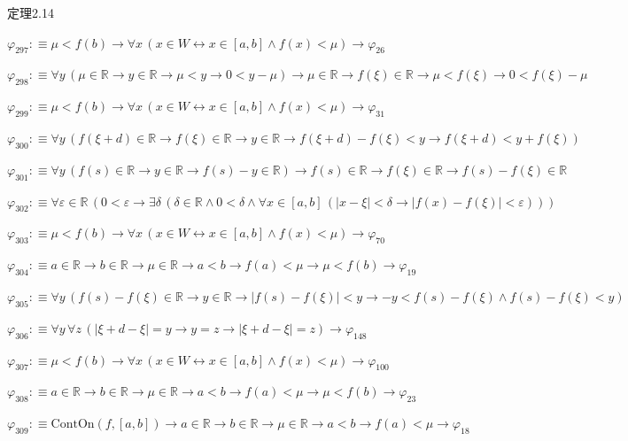 \begin{fullproof}{定理2.14}
\begin{abbrevlist}
\item $\varphi_{297} :\equiv \mu < f(b) \to \forall x\,(x \in W \leftrightarrow x \in [a,b] \land f(x) < \mu) \to \varphi_{26}$
\item $\varphi_{298} :\equiv \forall y\,(\mu \in \mathbb{R} \to y \in \mathbb{R} \to \mu < y \to 0 < y - \mu) \to \mu \in \mathbb{R} \to f(\xi) \in \mathbb{R} \to \mu < f(\xi) \to 0 < f(\xi) - \mu$
\item $\varphi_{299} :\equiv \mu < f(b) \to \forall x\,(x \in W \leftrightarrow x \in [a,b] \land f(x) < \mu) \to \varphi_{31}$
\item $\varphi_{300} :\equiv \forall y\,(f(\xi + d) \in \mathbb{R} \to f(\xi) \in \mathbb{R} \to y \in \mathbb{R} \to f(\xi + d) - f(\xi) < y \to f(\xi + d) < y + f(\xi))$
\item $\varphi_{301} :\equiv \forall y\,(f(s) \in \mathbb{R} \to y \in \mathbb{R} \to f(s) - y \in \mathbb{R}) \to f(s) \in \mathbb{R} \to f(\xi) \in \mathbb{R} \to f(s) - f(\xi) \in \mathbb{R}$
\item $\varphi_{302} :\equiv \forall \varepsilon \in \mathbb{R}\,(0 < \varepsilon \to \exists \delta\,(\delta \in \mathbb{R} \land 0 < \delta \land \forall x \in [a,b]\,(\lvert x - \xi \rvert < \delta \to \lvert f(x) - f(\xi) \rvert < \varepsilon)))$
\item $\varphi_{303} :\equiv \mu < f(b) \to \forall x\,(x \in W \leftrightarrow x \in [a,b] \land f(x) < \mu) \to \varphi_{70}$
\item $\varphi_{304} :\equiv a \in \mathbb{R} \to b \in \mathbb{R} \to \mu \in \mathbb{R} \to a < b \to f(a) < \mu \to \mu < f(b) \to \varphi_{19}$
\item $\varphi_{305} :\equiv \forall y\,(f(s) - f(\xi) \in \mathbb{R} \to y \in \mathbb{R} \to \lvert f(s) - f(\xi) \rvert < y \to -y < f(s) - f(\xi) \land f(s) - f(\xi) < y)$
\item $\varphi_{306} :\equiv \forall y\,\forall z\,(\lvert \xi + d - \xi \rvert = y \to y = z \to \lvert \xi + d - \xi \rvert = z) \to \varphi_{148}$
\item $\varphi_{307} :\equiv \mu < f(b) \to \forall x\,(x \in W \leftrightarrow x \in [a,b] \land f(x) < \mu) \to \varphi_{100}$
\item $\varphi_{308} :\equiv a \in \mathbb{R} \to b \in \mathbb{R} \to \mu \in \mathbb{R} \to a < b \to f(a) < \mu \to \mu < f(b) \to \varphi_{23}$
\item $\varphi_{309} :\equiv \mathrm{ContOn}(f,[a,b]) \to a \in \mathbb{R} \to b \in \mathbb{R} \to \mu \in \mathbb{R} \to a < b \to f(a) < \mu \to \varphi_{18}$

\end{abbrevlist}
\end{fullproof}

